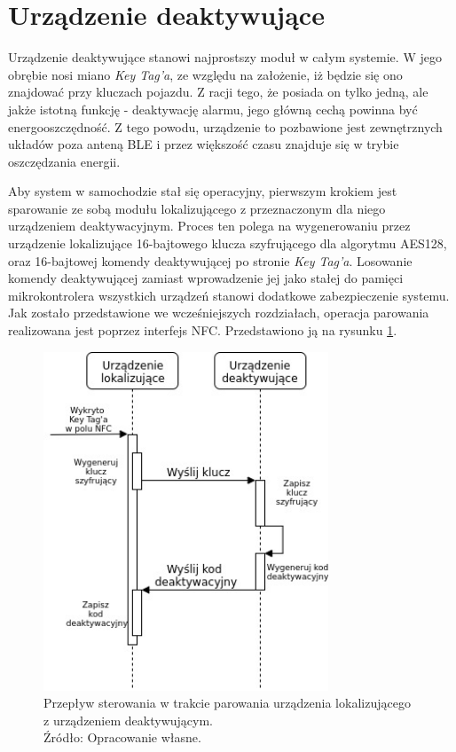 \section{Urządzenie deaktywujące}
\label{key_tag}

Urządzenie deaktywujące stanowi najprostszy moduł w całym systemie. W jego obrębie nosi miano \textit{Key Tag'a}, ze względu na założenie, iż będzie się ono znajdować przy kluczach pojazdu. Z racji tego, że posiada on tylko jedną, ale jakże istotną funkcję - deaktywację alarmu, jego główną cechą powinna być energooszczędność. Z tego powodu, urządzenie to  pozbawione jest zewnętrznych układów poza anteną BLE i przez większość czasu znajduje się w trybie oszczędzania energii. 

Aby system w samochodzie stał się operacyjny, pierwszym krokiem jest sparowanie ze sobą modułu lokalizującego z przeznaczonym dla niego urządzeniem deaktywacyjnym. Proces ten polega na wygenerowaniu przez urządzenie lokalizujące 16-bajtowego klucza szyfrującego dla algorytmu AES128, oraz 16-bajtowej komendy deaktywującej po stronie \textit{Key Tag'a}. Losowanie komendy deaktywującej zamiast wprowadzenie jej jako stałej do pamięci mikrokontrolera wszystkich urządzeń stanowi dodatkowe zabezpieczenie systemu. Jak zostało przedstawione we wcześniejszych rozdziałach, operacja parowania realizowana jest poprzez interfejs NFC. Przedstawiono ją na rysunku \ref{fig:image_soft_keytag_key exchange}.

\begin{figure}[H]
	\centering
	\includegraphics[width=8.5cm]{img/software/keytag/Key_exchange.jpg}
	\caption{Przepływ sterowania w trakcie parowania urządzenia lokalizującego z urządzeniem deaktywującym. 
	\\Źródło: Opracowanie własne.}
	\label{fig:image_soft_keytag_key exchange}
\end{figure}


